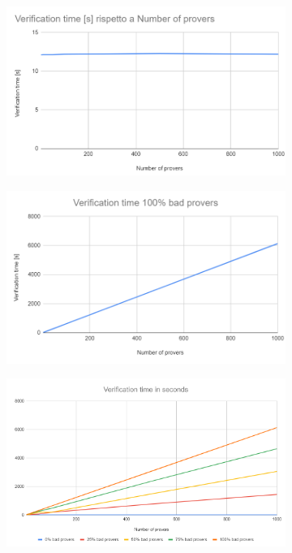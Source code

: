 \begin{figure}
\begin{subfigure}[t]{.49\textwidth}
  \caption{}
  \label{fig:aggregation_comparison}
\end{subfigure}
\hfill
\begin{subfigure}[t]{.49\textwidth}
  \centering
  \includegraphics[width=.90\linewidth]{Images/Verification_0.png}
  \caption{}
  \label{fig:verification_0}
\end{subfigure}
\begin{subfigure}[t]{.49\textwidth}
  \includegraphics[width=.90\linewidth]{Images/verification_100.png}
  \caption{}
  \label{fig:verification_100}
\end{subfigure}
\hfill
\begin{subfigure}[t]{.49\textwidth}
  \centering
  \includegraphics[width=.90\linewidth]{Images/verification_comparison.png}  
  \caption{}
  \label{fig:verification_comparison}
\end{subfigure}
\caption{}
\label{fig:prop_time}
\end{figure}